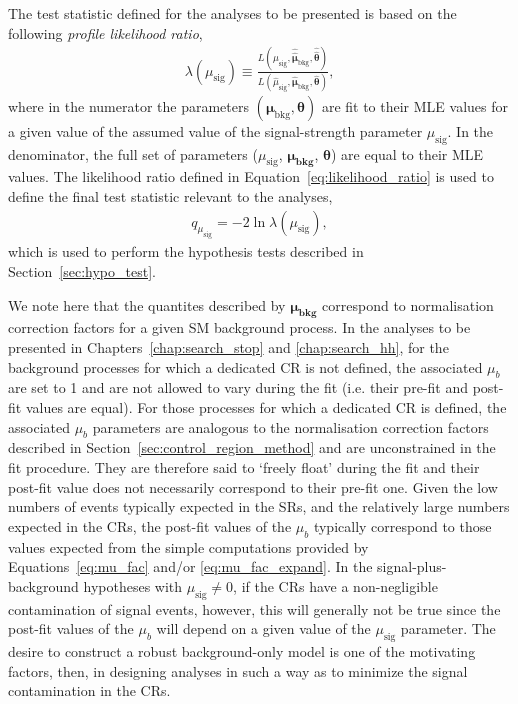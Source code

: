 The test statistic defined for the analyses to be presented is based on the following
\textit{profile likelihood ratio},
\begin{align}
    \lambda(\mu_{\text{sig}}) \equiv
        \frac{
            L(\mu_{\text{sig}}, \hat{\hat{\bm{\mu}}}_{\text{bkg}}, \hat{\hat{\bm{\theta}}})
        }
        {
            L(\hat{\mu}_{\text{sig}}, \hat{\bm{\mu}}_{\text{bkg}}, \hat{\bm{\theta}})
        },
    \label{eq:likelihood_ratio}
\end{align}
where in the numerator the parameters $(\bm{\mu}_{\text{bkg}}, \bm{\theta})$ are fit to their MLE values
for a given value of the assumed value of the signal-strength parameter $\mu_{\text{sig}}$.
In the denominator, the full set of parameters ($\mu_{\text{sig}}$, $\bm{\mu_{\text{bkg}}}$, $\bm{\theta}$) are
equal to their MLE values.
The likelihood ratio defined in Equation~\ref{eq:likelihood_ratio} is used to define the
final test statistic relevant to the analyses,
\begin{align}
    q_{\mu_{\text{sig}}} = - 2 \ln \lambda (\mu_{\text{sig}}),
    \label{eq:pll_test_stat}
\end{align}
which is used to perform the hypothesis tests described in Section~\ref{sec:hypo_test}.

We note here that the quantites described by $\bm{\mu_{\text{bkg}}}$ correspond to normalisation correction
factors for a given SM background process.
In the analyses to be presented in Chapters~\ref{chap:search_stop} and \ref{chap:search_hh},
for the background processes for which a dedicated CR is not defined, the associated $\mu_b$ are
set to 1 and are not allowed to vary during the fit (i.e. their pre-fit and post-fit values are equal).
For those processes for which a dedicated CR is defined, the associated $\mu_b$ parameters
are analogous to the normalisation correction factors described in Section~\ref{sec:control_region_method} and
are unconstrained in the fit procedure.
They are therefore said to `freely float' during the fit and 
their post-fit value does not necessarily correspond to their pre-fit one.
Given the low numbers of events typically expected in the SRs, and the relatively
large numbers expected in the CRs, the post-fit values of the $\mu_b$ typically
correspond to those values expected from the simple computations provided by Equations~\ref{eq:mu_fac}
and/or \ref{eq:mu_fac_expand}.
In the signal-plus-background hypotheses with $\mu_{\text{sig}} \ne 0$, if
the CRs have a non-negligible contamination of signal events, however, this will generally not be true
since the post-fit values of the $\mu_b$ will depend on a given value of the $\mu_{\text{sig}}$ parameter.
The desire to construct a robust background-only model is one of the motivating factors, then,
in designing analyses in such a way as to minimize the signal contamination in the CRs.

